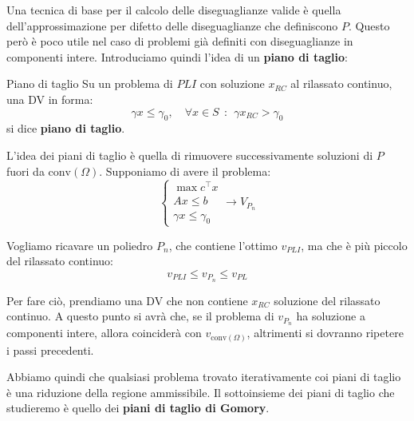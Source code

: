 \documentclass[a4paper,11pt]{article}
\begin{document}
Una tecnica di base per il calcolo delle diseguaglianze valide è quella dell'approssimazione per difetto delle diseguaglianze che definiscono $P$.
Questo però è poco utile nel caso di problemi già definiti con diseguaglianze in componenti intere.
Introduciamo quindi l'idea di un \textbf{piano di taglio}:

\begin{definition}{Piano di taglio}	
Su un problema di $PLI$ con soluzione $x_{RC}$ al rilassato continuo, una DV in forma:
$$ \gamma x \leq \gamma_0, \quad \forall x \in S \ \ : \ \ \gamma x_{RC} > \gamma_0 $$
si dice \textbf{piano di taglio}.
\end{definition}

L'idea dei piani di taglio è quella di rimuovere successivamente soluzioni di $P$ fuori da $\mathrm{conv}(\Omega)$.
Supponiamo di avere il problema:
\[
	\begin{cases}			
		\max c^\intercal x \\ 
		Ax \leq b \\ 
		\gamma x \leq \gamma_0
	\end{cases}
	\rightarrow V_{P_{n}}
\]

Vogliamo ricavare un poliedro $P_n$, che contiene l'ottimo $v_{PLI}$, ma che è più piccolo del rilassato continuo:
$$
v_{PLI} \leq v_{P_n} \leq v_{PL}
$$

Per fare ciò, prendiamo una DV che non contiene $x_{RC}$ soluzione del rilassato continuo. 
A questo punto si avrà che, se il problema di $v_{P_n}$ ha soluzione a componenti intere, allora coinciderà con $v_{\mathrm{conv}(\Omega)}$, altrimenti si dovranno ripetere i passi precedenti.

Abbiamo quindi che qualsiasi problema trovato iterativamente coi piani di taglio è una riduzione della regione ammissibile.
Il sottoinsieme dei piani di taglio che studieremo è quello dei \textbf{piani di taglio di Gomory}.
\end{document}

